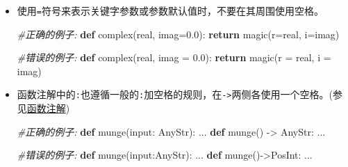 \documentclass[ignorenonframetext,9pt]{beamer}
\newenvironment{Shaded}{}{}
\newcommand{\BuiltInTok}[1]{#1}
\newcommand{\CommentTok}[1]{\textcolor[rgb]{0.38,0.63,0.69}{\textit{#1}}}
\newcommand{\ControlFlowTok}[1]{\textcolor[rgb]{0.00,0.44,0.13}{\textbf{#1}}}
\newcommand{\FloatTok}[1]{\textcolor[rgb]{0.25,0.63,0.44}{#1}}
\newcommand{\KeywordTok}[1]{\textcolor[rgb]{0.00,0.44,0.13}{\textbf{#1}}}
\newcommand{\NormalTok}[1]{#1}
\newcommand{\OperatorTok}[1]{\textcolor[rgb]{0.40,0.40,0.40}{#1}}
\begin{document}
\begin{frame}[fragile]

\begin{itemize}
\item
  使用\texttt{=}符号来表示关键字参数或参数默认值时，不要在其周围使用空格。

\begin{Shaded}
\begin{Highlighting}[]
\CommentTok{#正确的例子:}
\KeywordTok{def} \BuiltInTok{complex}\NormalTok{(real, imag}\OperatorTok{=}\FloatTok{0.0}\NormalTok{):}
\ControlFlowTok{return}\NormalTok{ magic(r}\OperatorTok{=}\NormalTok{real, i}\OperatorTok{=}\NormalTok{imag)}

\CommentTok{#错误的例子:}
\KeywordTok{def} \BuiltInTok{complex}\NormalTok{(real, imag }\OperatorTok{=} \FloatTok{0.0}\NormalTok{):}
\ControlFlowTok{return}\NormalTok{ magic(r }\OperatorTok{=}\NormalTok{ real, i }\OperatorTok{=}\NormalTok{ imag)}
\end{Highlighting}
\end{Shaded}
\end{itemize}

\end{frame}

\begin{frame}[fragile]

\begin{itemize}
\item
  函数注解中的\texttt{:}也遵循一般的\texttt{:}加空格的规则，在\texttt{-\textgreater{}}两侧各使用一个空格。(参见\protect\hyperlink{ux51fdux6570ux6ce8ux89e3ux28Functionux5cux2520annotationsux29}{函数注解})

\begin{Shaded}
\begin{Highlighting}[]
\CommentTok{#正确的例子:}
\KeywordTok{def}\NormalTok{ munge(}\BuiltInTok{input}\NormalTok{: AnyStr): ...}
\KeywordTok{def}\NormalTok{ munge() }\OperatorTok{->}\NormalTok{ AnyStr: ...}

\CommentTok{#错误的例子:}
\KeywordTok{def}\NormalTok{ munge(}\BuiltInTok{input}\NormalTok{:AnyStr): ...}
\KeywordTok{def}\NormalTok{ munge()}\OperatorTok{->}\NormalTok{PosInt: ...}
\end{Highlighting}
\end{Shaded}
\end{itemize}

\end{frame}
\end{document}
